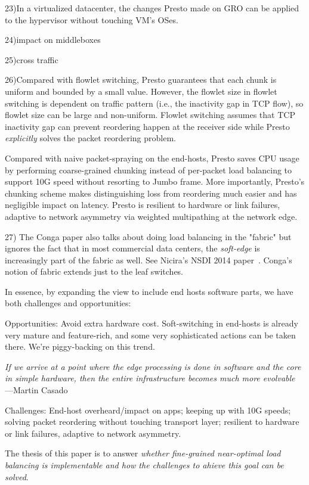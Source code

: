 23)In a virtualized datacenter, the changes Presto made on GRO can be applied to the hypervisor without touching VM's OSes.

24)impact on middleboxes

25)cross traffic

26)Compared with flowlet switching, Presto guarantees that each chunk is uniform and bounded by a small value. 
However, the flowlet size in flowlet switching
is dependent on traffic pattern (i.e., the inactivity gap in TCP flow), 
so flowlet size can be large and non-uniform. 
Flowlet switching assumes that TCP inactivity gap can prevent reordering happen at the receiver side while 
Presto {\em explicitly} solves the packet reordering problem.

Compared with naive packet-spraying on the end-hosts, Presto saves CPU usage by performing coarse-grained chunking instead of per-packet load balancing 
to support 10G speed without resorting to Jumbo frame. 
More importantly, Presto's chunking scheme makes distinguishing loss from reordering much easier and has negligible impact on latency.
Presto is resilient to hardware or link failures, adaptive to network asymmetry via weighted multipathing at the network edge.

27) The Conga paper also talks about doing load balancing in the "fabric" but 
ignores the fact that in most commercial data centers, 
the {\em soft-edge} is increasingly part of the fabric as well. 
See Nicira's NSDI 2014 paper~\cite{nv-mtd}. Conga's notion of fabric extends just to the leaf switches. 

In essence, by expanding the view to include end hosts software parts, we have both challenges and opportunities:

Opportunities: Avoid extra hardware cost. Soft-switching in end-hosts is already very mature and feature-rich, 
and some very sophisticated actions can be taken there. We're piggy-backing on this trend.

{ \em If we arrive at a point where the edge processing is done in software
and the core in simple hardware, then the entire infrastructure
becomes much more evolvable} ---Martin Casado~\cite{casado2012fabric}

Challenges: End-host overheard/impact on apps; keeping up with 10G speeds; solving packet reordering without touching transport layer; 
resilient to hardware or link failures, adaptive to network asymmetry.

The thesis of this paper is to answer {\em whether fine-grained near-optimal load balancing is implementable and 
how the challenges to ahieve this goal can be solved}.

